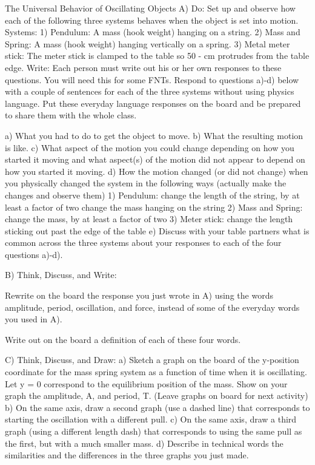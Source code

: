 The Universal Behavior of Oscillating Objects
A) Do:
Set up and observe how each of the following three systems behaves when the object is set into motion.
Systems:	1)	Pendulum:  A mass (hook weight) hanging on a string.
2)	Mass and Spring:  A mass (hook weight) hanging vertically on a spring.
3)	Metal meter stick: The meter stick is clamped to the table so 50 - \unit[90]{cm} protrudes from the table edge.
   Write: Each person must write out his or her own responses to these questions. You will need this for some FNTs.  Respond to questions a)-d) below with a couple of sentences for each of the three systems without using physics language. Put these everyday language responses on the board and be prepared to share them with the whole class.

a)	What you had to do to get the object to move.
b)	What the resulting motion is like.
c)	What aspect of the motion you could change depending on how you started it moving and what aspect(s) of the motion did not appear to depend on how you started it moving.
d)	How the motion changed (or did not change) when you physically changed the system in the following ways (actually make the changes and observe them)
1)	Pendulum:		change the length of the string, by at least a factor of two
				change  the mass hanging on the string
2)	Mass and Spring:	change the mass, by at least a factor of two
3)	Meter stick:	change the length sticking out past the edge of the table
 e)	Discuss with your table partners what is common across the three systems about your responses to each of the four questions a)-d).
 
\WCD

 B) Think, Discuss, and Write:
	\item Rewrite on the board the response you just wrote in A) using the words amplitude, period, oscillation, and force, instead of some of the everyday words you used in A).  
	\item Write out on the board a definition of each of these four words.

\WCD

 C) Think, Discuss, and Draw:
a)	Sketch a graph on the board of the y-position coordinate for the mass spring system as a function of time when it is oscillating.  Let y = 0 correspond to the equilibrium position of the mass.  Show on your graph the amplitude, A, and period, T.  (Leave graphs on board for next activity)
b)	On the same axis, draw a second graph (use a dashed line) that corresponds to starting the oscillation with a different pull.
c)	On the same axis, draw a third graph (using a different length dash) that corresponds to using the same pull as the first, but with a much smaller mass.
d)	Describe in technical words the similarities and the differences in the three graphs you just made.

\WCD
